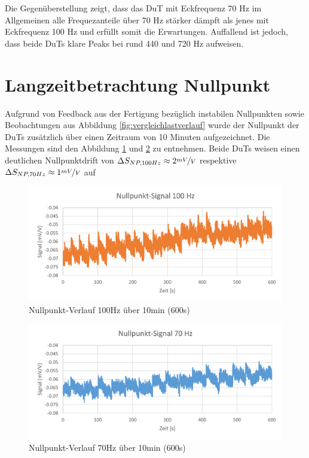 \documentclass[12pt,a4paper]{article}
\begin{document}
Die Gegenüberstellung zeigt, dass das DuT mit Eckfrequenz 70 Hz im Allgemeinen alle Frequezanteile über 70 Hz stärker dämpft als jenes mit Eckfrequenz 100 Hz und erfüllt somit die Erwartungen. Auffallend ist jedoch, dass beide DuTs klare Peaks bei rund 440 und 720 Hz aufweisen.
\section{Langzeitbetrachtung Nullpunkt}
Aufgrund von Feedback aus der Fertigung bezüglich instabilen Nullpunkten sowie Beobachtungen aus Abbildung \ref{fig:vergleichlastverlauf} wurde der Nullpunkt der DuTs zusätzlich über einen Zeitraum von 10 Minuten aufgezeichnet. Die Messungen sind den Abbildung \ref{fig:np100long} und \ref{fig:np70long} zu entnehmen. Beide DuTs weisen einen deutlichen Nullpunktdrift von $\Delta S_{NP,100Hz}\approx 2\nicefrac{mV}{V}$ respektive $\Delta S_{NP,70Hz}\approx 1\nicefrac{mV}{V}$ auf
\begin{figure}[H]
	\centering
	\includegraphics[width=1\linewidth]{imgs/NP100_Long}
	\caption{Nullpunkt-Verlauf 100Hz über 10min (600s)}
	\label{fig:np100long}
\end{figure}
\begin{figure}[H]
	\centering
	\includegraphics[width=1\linewidth]{imgs/NP70_Long}
	\caption{Nullpunkt-Verlauf 70Hz über 10min (600s)}
	\label{fig:np70long}
\end{figure}
\end{document}
